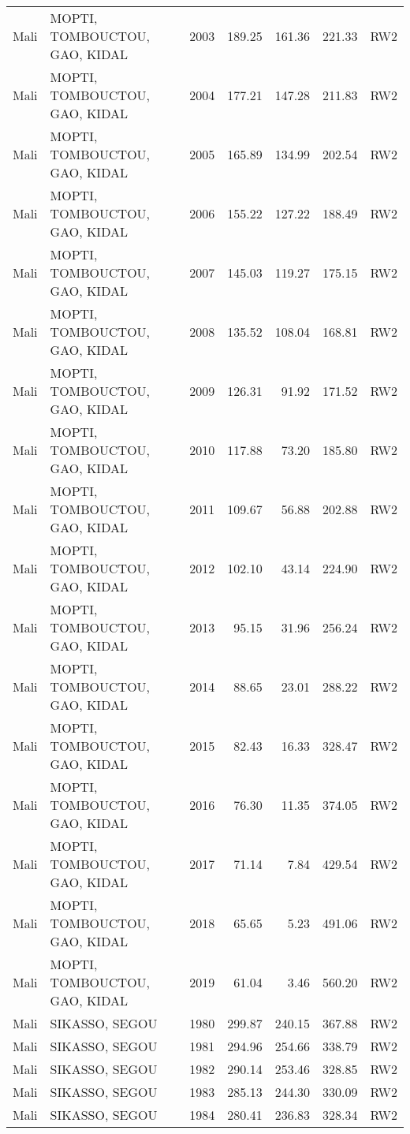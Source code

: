 \begin{longtable}{lllrrrl}
  Mali & MOPTI, TOMBOUCTOU, GAO, KIDAL & 2003 & 189.25 & 161.36 & 221.33 & RW2 \\ 
  Mali & MOPTI, TOMBOUCTOU, GAO, KIDAL & 2004 & 177.21 & 147.28 & 211.83 & RW2 \\ 
  Mali & MOPTI, TOMBOUCTOU, GAO, KIDAL & 2005 & 165.89 & 134.99 & 202.54 & RW2 \\ 
  Mali & MOPTI, TOMBOUCTOU, GAO, KIDAL & 2006 & 155.22 & 127.22 & 188.49 & RW2 \\ 
  Mali & MOPTI, TOMBOUCTOU, GAO, KIDAL & 2007 & 145.03 & 119.27 & 175.15 & RW2 \\ 
  Mali & MOPTI, TOMBOUCTOU, GAO, KIDAL & 2008 & 135.52 & 108.04 & 168.81 & RW2 \\ 
  Mali & MOPTI, TOMBOUCTOU, GAO, KIDAL & 2009 & 126.31 & 91.92 & 171.52 & RW2 \\ 
  Mali & MOPTI, TOMBOUCTOU, GAO, KIDAL & 2010 & 117.88 & 73.20 & 185.80 & RW2 \\ 
  Mali & MOPTI, TOMBOUCTOU, GAO, KIDAL & 2011 & 109.67 & 56.88 & 202.88 & RW2 \\ 
  Mali & MOPTI, TOMBOUCTOU, GAO, KIDAL & 2012 & 102.10 & 43.14 & 224.90 & RW2 \\ 
  Mali & MOPTI, TOMBOUCTOU, GAO, KIDAL & 2013 & 95.15 & 31.96 & 256.24 & RW2 \\ 
  Mali & MOPTI, TOMBOUCTOU, GAO, KIDAL & 2014 & 88.65 & 23.01 & 288.22 & RW2 \\ 
  Mali & MOPTI, TOMBOUCTOU, GAO, KIDAL & 2015 & 82.43 & 16.33 & 328.47 & RW2 \\ 
  Mali & MOPTI, TOMBOUCTOU, GAO, KIDAL & 2016 & 76.30 & 11.35 & 374.05 & RW2 \\ 
  Mali & MOPTI, TOMBOUCTOU, GAO, KIDAL & 2017 & 71.14 & 7.84 & 429.54 & RW2 \\ 
  Mali & MOPTI, TOMBOUCTOU, GAO, KIDAL & 2018 & 65.65 & 5.23 & 491.06 & RW2 \\ 
  Mali & MOPTI, TOMBOUCTOU, GAO, KIDAL & 2019 & 61.04 & 3.46 & 560.20 & RW2 \\ 
  Mali & SIKASSO, SEGOU & 1980 & 299.87 & 240.15 & 367.88 & RW2 \\ 
  Mali & SIKASSO, SEGOU & 1981 & 294.96 & 254.66 & 338.79 & RW2 \\ 
  Mali & SIKASSO, SEGOU & 1982 & 290.14 & 253.46 & 328.85 & RW2 \\ 
  Mali & SIKASSO, SEGOU & 1983 & 285.13 & 244.30 & 330.09 & RW2 \\ 
  Mali & SIKASSO, SEGOU & 1984 & 280.41 & 236.83 & 328.34 & RW2 \\ 

\end{longtable}
